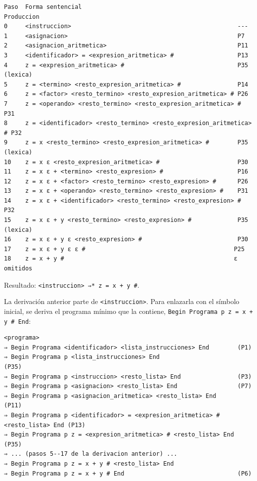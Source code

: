 \documentclass[11pt,letterpaper]{article}
\begin{document}
\begin{lstlisting}
Paso  Forma sentencial                                              Produccion
0     <instruccion>                                               ---
1     <asignacion>                                                P7
2     <asignacion_aritmetica>                                     P11
3     <identificador> = <expresion_aritmetica> #                  P13
4     z = <expresion_aritmetica> #                                P35 (lexica)
5     z = <termino> <resto_expresion_aritmetica> #                P14
6     z = <factor> <resto_termino> <resto_expresion_aritmetica> # P26
7     z = <operando> <resto_termino> <resto_expresion_aritmetica> # P31
8     z = <identificador> <resto_termino> <resto_expresion_aritmetica> # P32
9     z = x <resto_termino> <resto_expresion_aritmetica> #        P35 (lexica)
10    z = x ε <resto_expresion_aritmetica> #                      P30
11    z = x ε + <termino> <resto_expresion> #                     P16
12    z = x ε + <factor> <resto_termino> <resto_expresion> #      P26
13    z = x ε + <operando> <resto_termino> <resto_expresion> #    P31
14    z = x ε + <identificador> <resto_termino> <resto_expresion> # P32
15    z = x ε + y <resto_termino> <resto_expresion> #             P35 (lexica)
16    z = x ε + y ε <resto_expresion> #                           P30
17    z = x ε + y ε ε #                                          P25
18    z = x + y #                                                ε omitidos
\end{lstlisting}

Resultado: \lstinline|<instruccion> ⇒* z = x + y #|.

La derivación anterior parte de \lstinline|<instruccion>|. Para enlazarla con el símbolo inicial, se deriva
el programa mínimo que la contiene, \lstinline|Begin Programa p z = x + y # End|:

\begin{lstlisting}
<programa>
⇒ Begin Programa <identificador> <lista_instrucciones> End        (P1)
⇒ Begin Programa p <lista_instrucciones> End                      (P35)
⇒ Begin Programa p <instruccion> <resto_lista> End                (P3)
⇒ Begin Programa p <asignacion> <resto_lista> End                 (P7)
⇒ Begin Programa p <asignacion_aritmetica> <resto_lista> End      (P11)
⇒ Begin Programa p <identificador> = <expresion_aritmetica> # <resto_lista> End (P13)
⇒ Begin Programa p z = <expresion_aritmetica> # <resto_lista> End (P35)
⇒ ... (pasos 5--17 de la derivacion anterior) ...
⇒ Begin Programa p z = x + y # <resto_lista> End
⇒ Begin Programa p z = x + y # End                                (P6)
\end{lstlisting}
\end{document}
